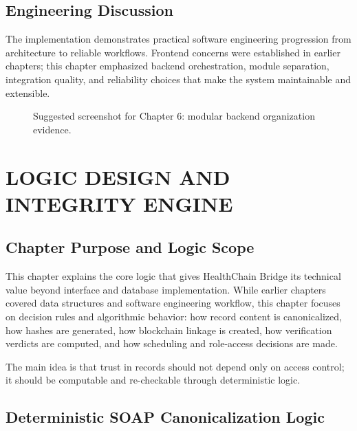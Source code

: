\documentclass[12pt,a4paper]{report}
\begin{document}
\section{Engineering Discussion}

The implementation demonstrates practical software engineering progression from architecture to reliable workflows. Frontend concerns were established in earlier chapters; this chapter emphasized backend orchestration, module separation, integration quality, and reliability choices that make the system maintainable and extensible.

\begin{figure}[H]
\centering
{}
\caption{Suggested screenshot for Chapter 6: modular backend organization evidence.}
\label{fig:placeholder-backend-structure}
\end{figure}

\chapter{LOGIC DESIGN AND INTEGRITY ENGINE}

\section{Chapter Purpose and Logic Scope}

This chapter explains the core logic that gives HealthChain Bridge its technical value beyond interface and database implementation. While earlier chapters covered data structures and software engineering workflow, this chapter focuses on decision rules and algorithmic behavior: how record content is canonicalized, how hashes are generated, how blockchain linkage is created, how verification verdicts are computed, and how scheduling and role-access decisions are made.

The main idea is that trust in records should not depend only on access control; it should be computable and re-checkable through deterministic logic.

\section{Deterministic SOAP Canonicalization Logic}
\end{document}
